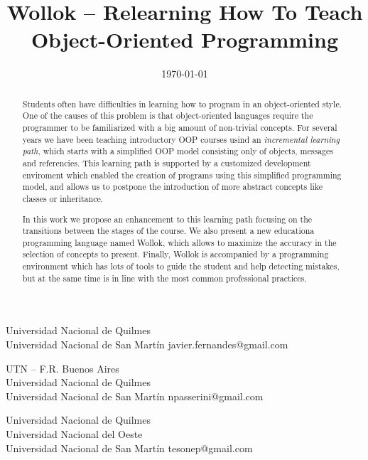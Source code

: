 \documentclass[preprint,10pt,nocopyrightspace]{sigplanconf}
\begin{document}
\title{Wollok -- Relearning How To Teach Object-Oriented Programming}
  {Universidad Nacional de Quilmes \\ Universidad Nacional de San Martín}
  {javier.fernandes@gmail.com}
  
  {UTN -- F.R. Buenos Aires \\ Universidad Nacional de Quilmes \\ Universidad Nacional de San Martín}
  {npasserini@gmail.com}
  
  {Universidad Nacional de Quilmes \\ Universidad Nacional del Oeste \\ Universidad Nacional de San Martín}
  {tesonep@gmail.com}

\date{\today}
\maketitle

\begin{abstract}
Students often have difficulties in learning how to program in an object-oriented style.
One of the causes of this problem is that object-oriented languages require the programmer to be familiarized with a big amount of non-trivial concepts.
For several years we have been teaching introductory OOP courses usind an \emph{incremental learning path}, 
which starts with a simplified OOP model consisting only of objects, messages and referencies.
This learning path is supported by a customized development enviroment which enabled the creation of programs using this {simplified programming model},
and allows us to postpone the introduction of more abstract concepts like classes or inheritance.

In this work we propose an enhancement to this learning path focusing on the transitions between the stages of the course.
We also present a new educationa programming language named Wollok, which allows to maximize the accuracy in the selection of concepts to present.
Finally, Wollok is accompanied by a programming environment which has lots of tools to guide the student and help detecting mistakes, 
but at the same time is in line with the most common professional practices.
\end{abstract}







\end{document}
